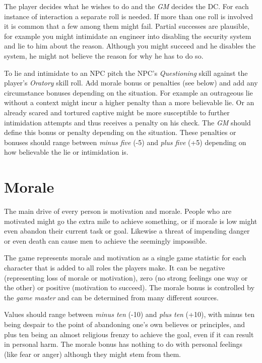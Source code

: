 The player decides what he wishes to do and the \emph{GM} decides the DC. For
each instance of interaction a separate roll is needed. If more than one roll
is involved it is common that a few among them might fail. Partial successes
are plausible, for example you might intimidate an engineer into disabling the
security system and lie to him about the reason. Although you might succeed
and he disables the system, he might not believe the reason for why he has to
do so.

To lie and intimidate to an NPC pitch the NPC's \emph{Questioning} skill
against the player's \emph{Oratory} skill roll. Add morale bonus or penalties
(see below) and add any circumstance bonuses depending on the situation. For
example an outrageous lie without a context might incur a higher penalty than
a more believable lie. Or an already scared and tortured captive might be more
susceptible to further intimidation attempts and thus receives a penalty on
his check. The \emph{GM} should define this bonus or penalty depending on the
situation. These penalties or bonuses should range between \emph{minus five}
(-5) and \emph{plus five} (+5) depending on how believable the lie or
intimidation is.

\section{Morale}

The main drive of every person is motivation and morale. People who are
motivated might go the extra mile to achieve something, or if morale is low
might even abandon their current task or goal. Likewise a threat of impending
danger or even death can cause men to achieve the seemingly impossible.

The game represents morale and motivation as a single game statistic for each
character that is added to all roles the players make. It can be negative
(representing loss of morale or motivation), zero (no strong feelings one way
or the other) or positive (motivation to succeed). The morale bonus is
controlled by the \emph{game master} and can be determined from many
different sources.

Values should range between \emph{minus ten} (-10) and \emph{plus ten} (+10),
with minus ten being despair to the point of abandoning one's own believes or
principles, and plus ten being an almost religious frenzy to achieve the
goal, even if it can result in personal harm. The morale bonus has nothing to
do with personal feelings (like fear or anger) although they might stem from
them.

